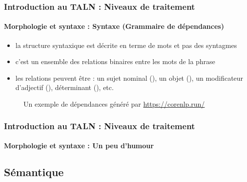 \documentclass[xcolor=table]{beamer}
\begin{document}
\begin{frame}
\frametitle{Introduction au TALN : Niveaux de traitement}
\framesubtitle{Morphologie et syntaxe : Syntaxe (Grammaire de dépendances)}

\begin{itemize}
	\item la structure syntaxique est décrite en terme de mots et pas des syntagmes
	\item c'est un ensemble des relations binaires entre les mots de la phrase
	\item les relations peuvent être : un sujet nominal (), un objet (), un modificateur d'adjectif (), déterminant (), etc.
\end{itemize}

\begin{figure}
	\caption{Un exemple de dépendances généré par \url{https://corenlp.run/}}
\end{figure}

\end{frame}

\begin{frame}
\frametitle{Introduction au TALN : Niveaux de traitement}
\framesubtitle{Morphologie et syntaxe : Un peu d'humour}

\begin{center}
\end{center}

\end{frame}

\subsection{Sémantique}
\end{document}

